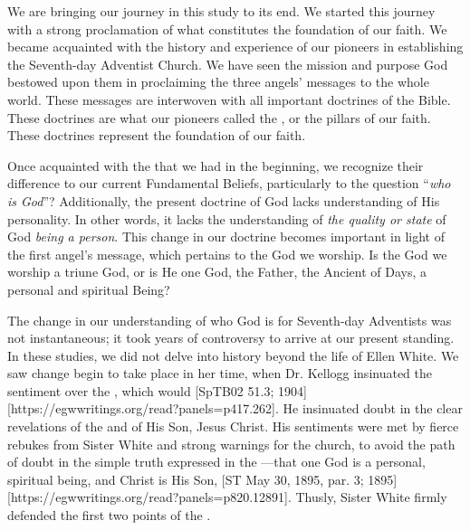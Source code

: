 
We are bringing our journey in this study to its end. We started this journey with a strong proclamation of what constitutes the foundation of our faith. We became acquainted with the history and experience of our pioneers in establishing the Seventh-day Adventist Church. We have seen the mission and purpose God bestowed upon them in proclaiming the three angels’ messages to the whole world. These messages are interwoven with all important doctrines of the Bible. These doctrines are what our pioneers called the , or the pillars of our faith. These doctrines represent the foundation of our faith.

Once acquainted with the  that we had in the beginning, we recognize their difference to our current Fundamental Beliefs, particularly to the question “\textit{who is God}”? Additionally, the present doctrine of God lacks understanding of His personality. In other words, it lacks the understanding of \textit{the quality or state} of God \textit{being a person}. This change in our doctrine becomes important in light of the first angel’s message, which pertains to the God we worship. Is the God we worship a triune God, or is He one God, the Father, the Ancient of Days, a personal and spiritual Being?

The change in our understanding of who God is for Seventh-day Adventists was not instantaneous; it took years of controversy to arrive at our present standing. In these studies, we did not delve into history beyond the life of Ellen White. We saw change begin to take place in her time, when Dr. Kellogg insinuated the sentiment over the , which would [SpTB02 51.3; 1904][https://egwwritings.org/read?panels=p417.262]. He insinuated doubt in the clear revelations of the  and of His Son, Jesus Christ. His sentiments were met by fierce rebukes from Sister White and strong warnings for the church, to avoid the path of doubt in the simple truth expressed in the —that one God is a personal, spiritual being, and Christ is His Son, [ST May 30, 1895, par. 3; 1895][https://egwwritings.org/read?panels=p820.12891]. Thusly, Sister White firmly defended the first two points of the .


